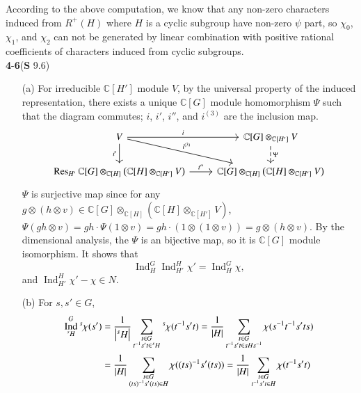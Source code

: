 \documentclass[a4paper, 12pt]{article}
\theoremstyle{Mydefinition}
\theoremstyle{Mytheorem}
\DeclareMathOperator{\Ind}{Ind}
\begin{document}
According to the above computation, we know that any non-zero characters induced from $R^+(H)$ where $H$ is a cyclic subgroup have non-zero $\psi$ part, so $\chi_0$, $\chi_1$, and $\chi_2$ can not be generated by linear combination with positive rational coefficients of characters induced from cyclic subgroups.\\

\noindent \textbf{4}-\textbf{6}(\textbf{S} 9.6)
\begin{enumerate}
    \item[(a)] For irreducible $\mathbb{C}[H']$ module $V$, by the universal property of the induced representation, there exists a unique $\mathbb{C}[G]$ module homomorphism $\Psi$ such that the diagram commutes; $i$, $i'$, $i''$, and $i^{(3)}$ are the inclusion map.
    \[
    \begin{tikzcd}
    V \arrow{dr}{i^{(3)}}\arrow{r}{i} \arrow[swap]{d}{i'} & \mathbb{C}[G]\otimes_{\mathbb{C}[H']}V \arrow[dashed]{d}{\Psi} \\
    \Res_{H'} \mathbb{C}[G]\otimes_{\mathbb{C}[H]}\left(\mathbb{C}[H]\otimes_{\mathbb{C}[H']}V\right)  \arrow{r}{i''} & 
    \mathbb{C}[G]\otimes_{\mathbb{C}[H]}\left(\mathbb{C}[H]\otimes_{\mathbb{C}[H']}V\right)
    \end{tikzcd}
    \]
    $\Psi$ is surjective map since for any $g\otimes (h\otimes v)\in \mathbb{C}[G]\otimes_{\mathbb{C}[H]}\left(\mathbb{C}[H]\otimes_{\mathbb{C}[H']}V\right)$, $\Psi(gh\otimes v) = gh\cdot \Psi(1\otimes v) = gh\cdot (1\otimes (1\otimes v)) = g\otimes (h\otimes v)$. By the dimensional analysis, the $\Psi$ is an bijective map, so it is $\mathbb{C}[G]$ module isomorphism. It shows that 
    \begin{equation}
        \Ind_H^G \Ind_{H'}^H \chi' = \Ind_{H}^G \chi,
    \end{equation}
    and $\Ind_{H'}^H \chi' - \chi\in N$.
    \item[(b)] For $s,s'\in G$,
    \begin{equation}
    \begin{split}
        \Ind_{\prescript{s}{\phantom{1}}{H}}^G\prescript{s}{\phantom{1}}{\chi}(s') &= \frac{1}{\abs{\prescript{s}{\phantom{s}}{H}}}\sum_{\substack{t\in G\\ t^{-1}s't\in \prescript{s}{\phantom{1}}{H}}}\prescript{s}{\phantom{1}}{\chi}(t^{-1}s't) =\frac{1}{\abs{H}}\sum_{\substack{t\in G\\ t^{-1}s't\in sHs^{-1}}}\chi(s^{-1}t^{-1}s'ts)\\
        &=\frac{1}{\abs{H}}\sum_{\substack{t\in G\\ (ts)^{-1}s'(ts)\in H}}\chi((ts)^{-1}s'(ts))=\frac{1}{\abs{H}}\sum_{\substack{t\in G\\ t^{-1}s't\in H}}\chi(t^{-1}s't)\\

\end{split}
\end{equation}
\end{enumerate}
\end{document}
